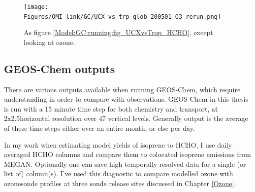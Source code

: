       \begin{figure}%
        \texttt{[image: Figures/OMI\_link/GC/UCX\_vs\_trp\_glob\_200501\_O3\_rerun.png]}
        \caption{%
          As figure \ref{Model:GC:running:fig_UCXvsTrop_HCHO}, except looking at ozone. 
        }
        \label{Model:GC:running:fig_UCXvsTrop_O3}
      \end{figure}
  
  \subsection{GEOS-Chem outputs}
    \label{Model:GC:outputs}
    There are various outputs available when running GEOS-Chem, which require understanding in order to compare with observations.
    GEOS-Chem in this thesis is run with a 15 minute time step for both chemistry and transport, at 2x2.5\degr horizontal resolution over 47 vertical levels.
    Generally output is the average of these time steps either over an entire month, or else per day.
    
    In my work when estimating model yields of isoprene to HCHO, I use daily averaged HCHO columns and compare them to colocated isoprene emissions from MEGAN.
    Optionally one can save high temporally resolved data for a single (or list of) column(s).
    I've used this diagnostic to compare modelled ozone with ozonesonde profiles at three sonde release sites discussed in Chapter \ref{Ozone}.
    
